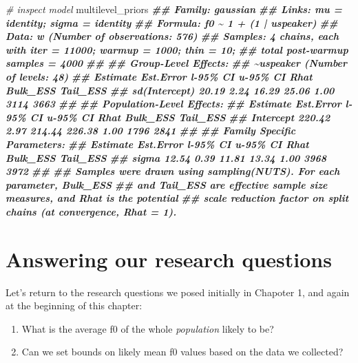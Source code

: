 \documentclass[
]{book}
\newenvironment{Shaded}{\begin{snugshade}}{\end{snugshade}}
\newcommand{\CommentTok}[1]{\textcolor[rgb]{0.56,0.35,0.01}{\textit{#1}}}
\newcommand{\DocumentationTok}[1]{\textcolor[rgb]{0.56,0.35,0.01}{\textbf{\textit{#1}}}}
\newcommand{\NormalTok}[1]{#1}
\begin{document}
\begin{Shaded}
\begin{Highlighting}[]
\CommentTok{\# inspect model}
\NormalTok{multilevel\_priors}
\DocumentationTok{\#\#  Family: gaussian }
\DocumentationTok{\#\#   Links: mu = identity; sigma = identity }
\DocumentationTok{\#\# Formula: f0 \textasciitilde{} 1 + (1 | uspeaker) }
\DocumentationTok{\#\#    Data: w (Number of observations: 576) }
\DocumentationTok{\#\# Samples: 4 chains, each with iter = 11000; warmup = 1000; thin = 10;}
\DocumentationTok{\#\#          total post{-}warmup samples = 4000}
\DocumentationTok{\#\# }
\DocumentationTok{\#\# Group{-}Level Effects: }
\DocumentationTok{\#\# \textasciitilde{}uspeaker (Number of levels: 48) }
\DocumentationTok{\#\#               Estimate Est.Error l{-}95\% CI u{-}95\% CI Rhat Bulk\_ESS Tail\_ESS}
\DocumentationTok{\#\# sd(Intercept)    20.19      2.24    16.29    25.06 1.00     3114     3663}
\DocumentationTok{\#\# }
\DocumentationTok{\#\# Population{-}Level Effects: }
\DocumentationTok{\#\#           Estimate Est.Error l{-}95\% CI u{-}95\% CI Rhat Bulk\_ESS Tail\_ESS}
\DocumentationTok{\#\# Intercept   220.42      2.97   214.44   226.38 1.00     1796     2841}
\DocumentationTok{\#\# }
\DocumentationTok{\#\# Family Specific Parameters: }
\DocumentationTok{\#\#       Estimate Est.Error l{-}95\% CI u{-}95\% CI Rhat Bulk\_ESS Tail\_ESS}
\DocumentationTok{\#\# sigma    12.54      0.39    11.81    13.34 1.00     3968     3972}
\DocumentationTok{\#\# }
\DocumentationTok{\#\# Samples were drawn using sampling(NUTS). For each parameter, Bulk\_ESS}
\DocumentationTok{\#\# and Tail\_ESS are effective sample size measures, and Rhat is the potential}
\DocumentationTok{\#\# scale reduction factor on split chains (at convergence, Rhat = 1).}
\end{Highlighting}
\end{Shaded}

\hypertarget{answering-our-research-questions}{%
\section{Answering our research questions}\label{answering-our-research-questions}}

Let's return to the research questions we posed initially in Chapoter 1, and again at the beginning of this chapter:

\begin{enumerate}
\def\labelenumi{\arabic{enumi})}
\item
  What is the average f0 of the whole \emph{population} likely to be?
\item
  Can we set bounds on likely mean f0 values based on the data we collected?
\end{enumerate}
\end{document}
